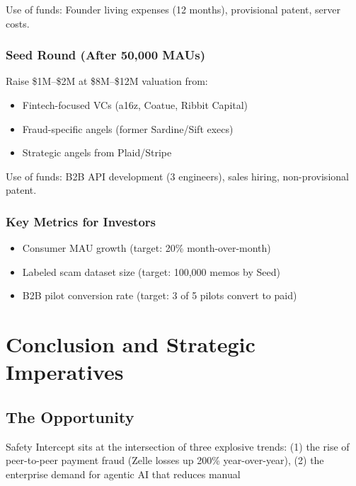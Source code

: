 \documentclass[12pt]{article}
\begin{document}
Use of funds: Founder living expenses (12 months), provisional patent, server costs.

\subsubsection{Seed Round (After 50,000 MAUs)}
Raise \$1M–\$2M at \$8M–\$12M valuation from:
\begin{itemize}
    \item Fintech-focused VCs (a16z, Coatue, Ribbit Capital)
    \item Fraud-specific angels (former Sardine/Sift execs)
    \item Strategic angels from Plaid/Stripe
\end{itemize}

Use of funds: B2B API development (3 engineers), sales hiring, non-provisional patent.

\subsubsection{Key Metrics for Investors}
\begin{itemize}
    \item Consumer MAU growth (target: 20\% month-over-month)
    \item Labeled scam dataset size (target: 100,000 memos by Seed)
    \item B2B pilot conversion rate (target: 3 of 5 pilots convert to paid)
\end{itemize}

\newpage
\section{Conclusion and Strategic Imperatives}

\subsection{The Opportunity}
Safety Intercept sits at the intersection of three explosive trends: (1) the rise of peer-to-peer payment fraud (Zelle losses up 200\% year-over-year), (2) the enterprise demand for agentic AI that reduces manual
\end{document}
